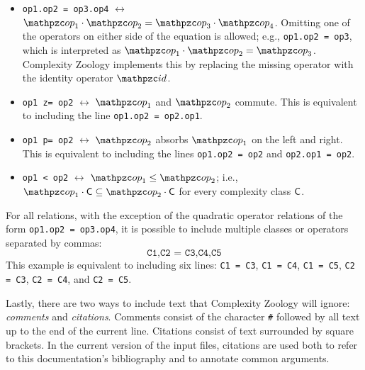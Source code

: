 \begin{itemize}
\item \texttt{op1.op2 = op3.op4} $\leftrightarrow$ 
  $\op_1\cdot\op_2=\op_3\cdot\op_4$. Omitting
  one of the operators on either side of the equation is allowed; e.g.,
  \texttt{op1.op2 = op3}, which is interpreted as $\op_1\cdot\op_2=\op_3$.
  Complexity Zoology implements this by replacing the missing operator with the
  identity operator $\id$.
\item \texttt{op1 z= op2} $\leftrightarrow$ $\op_1$ and $\op_2$ commute. 
  This is equivalent to including the line \texttt{op1.op2 = op2.op1}.
\item \texttt{op1 p= op2} $\leftrightarrow$ $\op_2$ absorbs $\op_1$ on the 
  left and right. This is equivalent to including the lines \texttt{op1.op2 = 
  op2} and \texttt{op2.op1 = op2}.
\item \texttt{op1 < op2} $\leftrightarrow$ $\op_1\leq\op_2$; i.e.,
  $\op_1\cdot\sC\subseteq\op_2\cdot\sC$ for every complexity class $\mathsf{C}$.
\end{itemize}
For all relations, with the exception of the quadratic operator relations of the
form \texttt{op1.op2 = op3.op4}, it is possible to include multiple classes or
operators separated by commas:
\[
\texttt{C1,C2 = C3,C4,C5}
\]
This example is equivalent to including six lines: \texttt{C1 = C3},
\texttt{C1 = C4}, \texttt{C1 = C5}, \texttt{C2 = C3}, \texttt{C2 = C4}, and
\texttt{C2 = C5}.

Lastly, there are two ways to include text that Complexity Zoology will ignore:
\textit{comments} and \textit{citations}. Comments consist of the character
\texttt{\#} followed by all text up to the end of the current line. Citations
consist of text surrounded by square brackets. In the current version of the
input files, citations are used both to refer to this documentation's
bibliography and to annotate common arguments.

